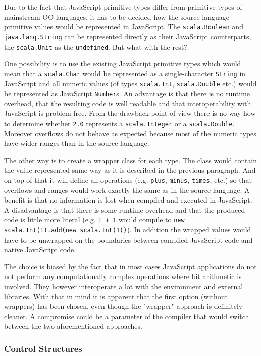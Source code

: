 \documentclass[12pt,a4paper]{report}
\begin{document}
Due to the fact that JavaScript primitive types differ from primitive types of mainstream OO languages, it has to be decided how the source language primitive values  would be represented in JavaScript. The \texttt{scala.Boolean} and \texttt{java.lang.String} can be represented directly as their JavaScript counterparts, the \texttt{scala.Unit} as the \texttt{undefined}. But what with the rest? 

One possibility is to use the existing JavaScript primitive types which would mean that a \texttt{scala.Char} would be represented as a single-character \texttt{String} in JavaScript and all numeric values (of types \texttt{scala.Int}, \texttt{scala.Double} etc.) would be represented as JavaScript \texttt{Number}s. An advantage is that there is no runtime overhead, that the resulting code is well readable and that interoperability with JavaScript is problem-free. From the drawback point of view there is no way how to determine whether \texttt{2.0} represents a \texttt{scala.Integer} or a \texttt{scala.Double}. Moreover overflows do not behave as expected because most of the numeric types have wider ranges than in the source language.

The other way is to create a wrapper class for each type. The class would contain the value represented same way as it is described in the previous paragraph. And on top of that it will define all operations (e.g. \texttt{plus}, \texttt{minus}, \texttt{times}, etc.) so that overflows and ranges would work exactly the same as in the source language. A benefit is that no information is lost when compiled and executed in JavaScript. A disadvantage is that there is some runtime overhead and that the produced code is little more literal (e.g. \texttt{1 + 1} would compile to \texttt{new scala.Int(1).add(new scala.Int(1))}). In addition the wrapped values would have to be unwrapped on the boundaries between compiled JavaScript code and native JavaScript code. 

The choice is biased by the fact that in most cases JavaScript applications do not not perform any computationally complex operations where bit arithmetic is involved. They however interoperate a lot with the environment and external libraries. With that in mind it is apparent that the first option (without wrappers) has been chosen, even though the "wrapper" approach is definitely cleaner. A compromise could be a parameter of the compiler that would switch between the two aforementioned approaches.

\subsubsection*{Control Structures}
\end{document}
